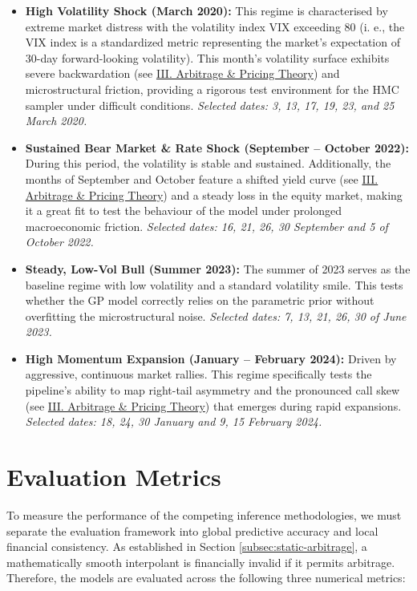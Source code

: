 \documentclass[12pt,oneside]{report}
\theoremstyle{definition}
\theoremstyle{remark}
\begin{document}
\begin{itemize}
    \item \textbf{High Volatility Shock (March 2020):} 
    This regime is characterised by extreme market distress with the volatility index VIX exceeding 80 (i. e., the VIX index is a standardized metric representing the market's expectation of 30-day forward-looking volatility). This month's volatility surface exhibits severe backwardation (see \hyperref[sec:glossary_arbitrage_pricing_theory]{III. Arbitrage \& Pricing Theory}) and microstructural friction, providing a rigorous test environment for the HMC sampler under difficult conditions. \textit{Selected dates: 3, 13, 17, 19, 23, and 25 March 2020.}
    
    \item \textbf{Sustained Bear Market \& Rate Shock (September -- October 2022):} During this period, the volatility is stable and sustained. Additionally, the months of September and October feature a shifted yield curve (see \hyperref[sec:glossary_arbitrage_pricing_theory]{III. Arbitrage \& Pricing Theory}) and a steady loss in the equity market, making it a great fit to test the behaviour of the model under prolonged macroeconomic friction. \textit{Selected dates: 16, 21, 26, 30 September and 5 of October 2022.}
    
    \item \textbf{Steady, Low-Vol Bull (Summer 2023):} 
    The summer of 2023 serves as the baseline regime with low volatility and a standard volatility smile. This tests whether the GP model correctly relies on the parametric prior without overfitting the microstructural noise. \textit{Selected dates: 7, 13, 21, 26, 30 of June 2023.}
    
    \item \textbf{High Momentum Expansion (January -- February 2024):} 
    Driven by aggressive, continuous market rallies. This regime specifically tests the pipeline's ability to map right-tail asymmetry and the pronounced call skew (see \hyperref[sec:glossary_arbitrage_pricing_theory]{III. Arbitrage \& Pricing Theory}) that emerges during rapid expansions. \textit{Selected dates: 18, 24, 30 January and 9, 15 February 2024.}
\end{itemize}

\section{Evaluation Metrics}
To measure the performance of the competing inference methodologies, we must separate the evaluation framework into global predictive accuracy and local financial consistency. As established in Section \ref{subsec:static-arbitrage}, a mathematically smooth interpolant is financially invalid if it permits arbitrage. Therefore, the models are evaluated across the following three numerical metrics:
\end{document}
